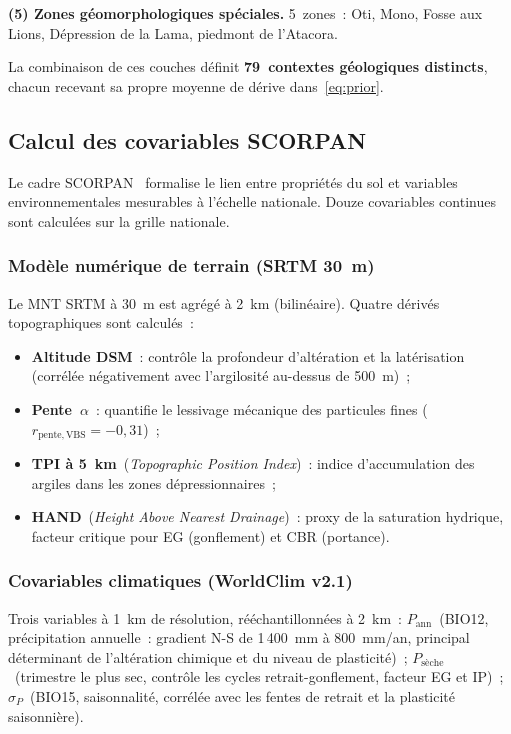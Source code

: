 \documentclass[10pt,a4paper,twocolumn]{article}
\begin{document}
	\textbf{(5) Zones géomorphologiques spéciales.}
	5~zones~: Oti, Mono, Fosse aux Lions, Dépression de la Lama,
	piedmont de l'Atacora.
	
	La combinaison de ces couches définit
	\textbf{79~contextes géologiques distincts}, chacun recevant
	sa propre moyenne de dérive dans~\eqref{eq:prior}.
	
	\subsection{Calcul des covariables SCORPAN}
	\label{sec:covariables}
	
	Le cadre SCORPAN~\cite{mcbratney2003digital} formalise le lien
	entre propriétés du sol et variables environnementales mesurables
	à l'échelle nationale.
	Douze covariables continues sont calculées sur la grille nationale.
	
	\subsubsection{Modèle numérique de terrain (SRTM 30~m)}
	
	Le MNT SRTM à 30~m est agrégé à 2~km (bilinéaire).
	Quatre dérivés topographiques sont calculés~:
	\begin{itemize}[noitemsep]
		\item \textbf{Altitude DSM}~: contrôle la profondeur d'altération et
		la latérisation (corrélée négativement avec l'argilosité au-dessus
		de 500~m)~;
		\item \textbf{Pente~$\alpha$}~: quantifie le lessivage mécanique des
		particules fines ($r_{\mathrm{pente,VBS}}=-0{,}31$)~;
		\item \textbf{TPI à 5~km}~(\textit{Topographic Position Index})~:
		indice d'accumulation des argiles dans les zones dépressionnaires~;
		\item \textbf{HAND}~(\textit{Height Above Nearest Drainage})~:
		proxy de la saturation hydrique, facteur critique pour EG
		(gonflement) et CBR (portance).
	\end{itemize}
	
	\subsubsection{Covariables climatiques (WorldClim v2.1)}
	
	Trois variables à 1~km de résolution, rééchantillonnées à 2~km~:
	$P_{\mathrm{ann}}$~(BIO12, précipitation annuelle~: gradient N-S
	de 1\,400~mm à 800~mm/an, principal déterminant de l'altération
	chimique et du niveau de plasticité)~;
	$P_{\mathrm{sèche}}$~(trimestre le plus sec, contrôle les cycles
	retrait-gonflement, facteur EG et IP)~;
	$\sigma_P$~(BIO15, saisonnalité, corrélée avec les fentes de
	retrait et la plasticité saisonnière).
	
\end{document}
